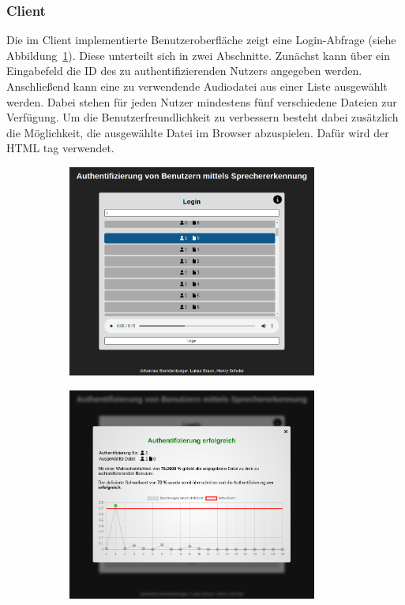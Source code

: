\subsubsection{Client}
Die im Client implementierte Benutzeroberfläche zeigt eine Login-Abfrage (siehe Abbildung~\ref{fig:AppLogin}).
Diese unterteilt sich in zwei Abschnitte.
Zunächst kann über ein Eingabefeld die ID des zu authentifizierenden Nutzers angegeben werden.
Anschließend kann eine zu verwendende Audiodatei aus einer Liste ausgewählt werden.
Dabei stehen für jeden Nutzer mindestens fünf verschiedene Dateien zur Verfügung.
Um die Benutzerfreundlichkeit zu verbessern besteht dabei zusätzlich die Möglichkeit, die ausgewählte Datei im Browser abzuspielen.
Dafür wird der HTML  tag verwendet.
\begin{figure}[H]
    \begin{subfigure}[c]{0.49\textwidth}
        \centering
        \includegraphics[width=0.9\textwidth, keepaspectratio]{images/UI.png}
        \label{fig:AppLogin}
    \end{subfigure}
    \begin{subfigure}[c]{0.49\textwidth}
        \centering
        \includegraphics[width=0.9\textwidth, keepaspectratio]{images/UIResult.png}

\end{subfigure}
\end{figure}
